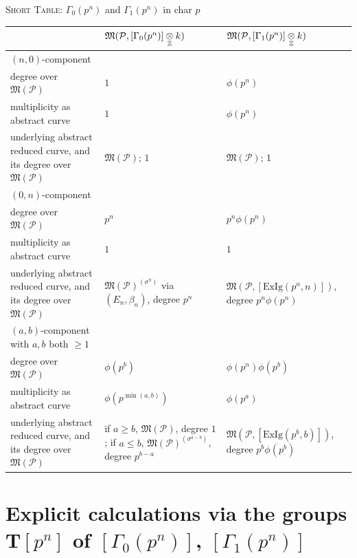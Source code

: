 \begin{center}
{\scriptsize
\renewcommand{\arraystretch}{1.35}
\setlength{\tabcolsep}{3pt}
\noindent\textsc{Short Table:} $\Gamma_0(p^n)$ and $\Gamma_1(p^n)$ in char $p$
\par\smallskip
\begin{tabular}{@{}>{\raggedright\arraybackslash}p{3.35cm}|>{\centering\arraybackslash}p{2.45cm}|>{\centering\arraybackslash}p{3.05cm}|}
\hline
& $\mathfrak{M}(\mathcal{P}, [\Gamma_0(p^n)] \underset{\mathbb{Z}}{\otimes} k)$ & $\mathfrak{M}(\mathcal{P}, [\Gamma_1(p^n)] \underset{\mathbb{Z}}{\otimes} k)$ \\
\hline
$(n,0)$-component & & \\
\hline
degree over $\mathfrak{M}(\mathcal{P})$ & $1$ & $\phi(p^n)$ \\
\hline
multiplicity as abstract curve & $1$ & $\phi(p^n)$ \\
\hline
underlying abstract reduced curve, and its degree over $\mathfrak{M}(\mathcal{P})$ & $\mathfrak{M}(\mathcal{P})$; $1$ & $\mathfrak{M}(\mathcal{P})$; $1$ \\
\hline
$(0,n)$-component & & \\
\hline
degree over $\mathfrak{M}(\mathcal{P})$ & $p^n$ & $p^n \phi(p^n)$ \\
\hline
multiplicity as abstract curve & $1$ & $1$ \\
\hline
underlying abstract reduced curve, and its degree over $\mathfrak{M}(\mathcal{P})$ & $\mathfrak{M}(\mathcal{P})^{(\sigma^n)}$ via $(E_n, \beta_n)$, degree $p^n$ & $\mathfrak{M}(\mathcal{P}, [\mathrm{ExIg}(p^n, n)])$, degree $p^n \phi(p^n)$ \\
\hline
$(a,b)$-component with $a, b$ both $\ge 1$ & & \\
\hline
degree over $\mathfrak{M}(\mathcal{P})$ & $\phi(p^b)$ & $\phi(p^n) \phi(p^b)$ \\
\hline
multiplicity as abstract curve & $\phi(p^{\min(a,b)})$ & $\phi(p^a)$ \\
\hline
underlying abstract reduced curve, and its degree over $\mathfrak{M}(\mathcal{P})$ & if $a \ge b$, $\mathfrak{M}(\mathcal{P})$, degree $1$; if $a \le b$, $\mathfrak{M}(\mathcal{P})^{(\sigma^{a-b})}$, degree $p^{b-a}$ & $\mathfrak{M}(\mathcal{P}, [\mathrm{ExIg}(p^b, b)])$, degree $p^b \phi(p^b)$ \\
\hline
\end{tabular}}
\end{center}

\section[Explicit calculations via the groups {$\mathbf{T}[p^n]$} of {$[\Gamma_0(p^n)]$}, {$[\Gamma_1(p^n)]$}]{Explicit calculations via the groups $\mathbf{T}[p^n]$ of \texorpdfstring{$[\Gamma_0(p^n)]$}{[Gamma_0(p^n)]}, \texorpdfstring{$[\Gamma_1(p^n)]$}{[Gamma_1(p^n)]}}
\label{sec:13.6}

